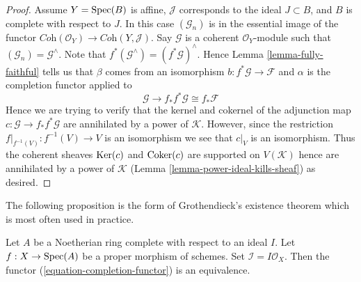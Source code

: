 \begin{proof}
\medskip\noindent
Assume $Y = \mathop{\mathrm{Spec}}(B)$ is affine, $\mathcal{J}$ corresponds to the ideal
$J \subset B$, and $B$ is complete with respect to $J$.
In this case $(\mathcal{G}_n)$ is in the essential image of the functor
$\textit{Coh}(\mathcal{O}_Y) \to \textit{Coh}(Y, \mathcal{J})$.
Say $\mathcal{G}$ is a coherent $\mathcal{O}_Y$-module such that
$(\mathcal{G}_n) = \mathcal{G}^\wedge$. Note that
$f^*(\mathcal{G}^\wedge) = (f^*\mathcal{G})^\wedge$. Hence
Lemma \ref{lemma-fully-faithful}
tells us that $\beta$ comes from an isomorphism
$b : f^*\mathcal{G} \to \mathcal{F}$
and $\alpha$ is the completion functor applied to
$$
\mathcal{G} \to f_*f^*\mathcal{G} \cong f_*\mathcal{F}
$$
Hence we are trying to verify that the kernel and cokernel of the
adjunction map $c : \mathcal{G} \to f_*f^*\mathcal{G}$ are annihilated by
a power of $\mathcal{K}$. However, since the restriction
$f|_{f^{-1}(V)} : f^{-1}(V) \to V$ is an isomorphism
we see that $c|_V$ is an isomorphism. Thus the coherent sheaves
$\mathop{\mathrm{Ker}}(c)$ and $\mathop{\mathrm{Coker}}(c)$ are supported on $V(\mathcal{K})$
hence are annihilated by a power of $\mathcal{K}$
(Lemma \ref{lemma-power-ideal-kills-sheaf}) as desired.
\end{proof}

\noindent
The following proposition is the form of Grothendieck's existence
theorem which is most often used in practice.

\begin{proposition}
\label{proposition-existence-proper}
Let $A$ be a Noetherian ring complete with respect to an ideal $I$.
Let $f : X \to \mathop{\mathrm{Spec}}(A)$ be a proper morphism of schemes.
Set $\mathcal{I} = I\mathcal{O}_X$.
Then the functor (\ref{equation-completion-functor}) is an equivalence.
\end{proposition}

